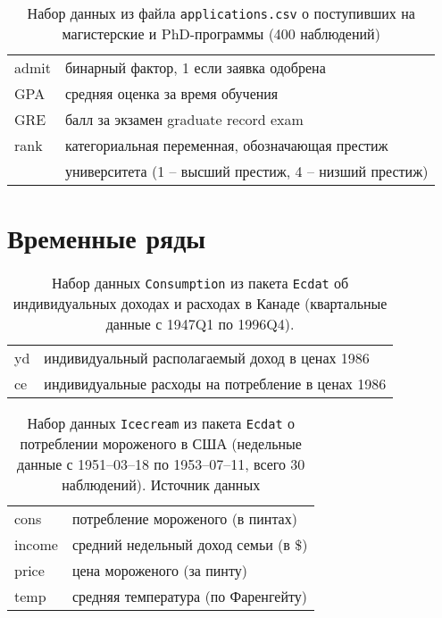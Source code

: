 \documentclass[12pt]{article}
\theoremstyle{remark}
\begin{document}
\begin{table}
	\caption{Набор данных из файла \texttt{applications.csv}
	о поступивших на магистерские и PhD-программы (400 наблюдений)} 
	\label{applicationsDataset}
	\begin{tabular}{l|l}\hline
	admit & бинарный фактор, 1 если заявка одобрена \\
	GPA &средняя оценка за время обучения \\
	GRE & балл за экзамен graduate record exam \\
	rank & категориальная переменная, обозначающая престиж \\
	& университета (1 -- высший престиж, 4 -- низший престиж) \\
	\hline
	\end{tabular}
\end{table}

\newpage

\section{Временные ряды}

\begin{table}
	\caption{Набор данных \texttt{Consumption}
	из пакета \texttt{Ecdat} об индивидуальных доходах и расходах  в Канаде
	(квартальные  данные  с 1947Q1 по 1996Q4). }
	\label{Consumption}
	\begin{tabular}{l|l}\hline
	yd & индивидуальный располагаемый доход в ценах 1986 \\
	ce & индивидуальные расходы на потребление в ценах 1986 \\
	\hline
	\end{tabular}
\end{table}

\begin{table}
	\caption{Набор данных \texttt{Icecream}
	из пакета \texttt{Ecdat} о потреблении мороженого в США
	(недельные данные  с 1951–03–18 по 1953–07–11, всего 30  наблюдений). 
	Источник данных \cite{Icecream}}
	\label{Icecream}
	\begin{tabular}{l|l}\hline
	cons & потребление мороженого (в пинтах) \\
	income  &  средний недельный доход семьи (в \$) \\
	price & цена мороженого (за пинту) \\
	temp & средняя температура (по Фаренгейту) \\
	\hline
	\end{tabular}
\end{table}
\end{document}
